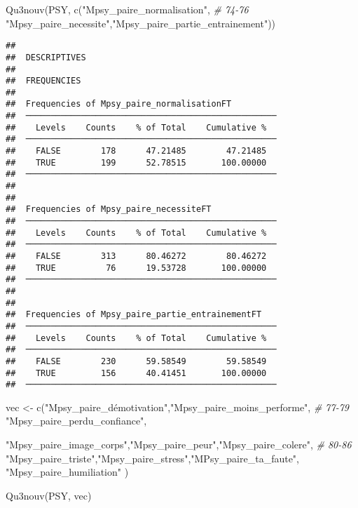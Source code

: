 \documentclass[
]{article}
\newenvironment{Shaded}{\begin{snugshade}}{\end{snugshade}}
\newcommand{\CommentTok}[1]{\textcolor[rgb]{0.56,0.35,0.01}{\textit{#1}}}
\newcommand{\FunctionTok}[1]{\textcolor[rgb]{0.00,0.00,0.00}{#1}}
\newcommand{\NormalTok}[1]{#1}
\newcommand{\OtherTok}[1]{\textcolor[rgb]{0.56,0.35,0.01}{#1}}
\newcommand{\StringTok}[1]{\textcolor[rgb]{0.31,0.60,0.02}{#1}}
\begin{document}
\begin{Shaded}
\begin{Highlighting}[]
\FunctionTok{Qu3nouv}\NormalTok{(PSY, }\FunctionTok{c}\NormalTok{(}\StringTok{"Mpsy\_paire\_normalisation"}\NormalTok{,  }\CommentTok{\# 74{-}76}
               \StringTok{"Mpsy\_paire\_necessite"}\NormalTok{,}\StringTok{"Mpsy\_paire\_partie\_entrainement"}\NormalTok{))}
\end{Highlighting}
\end{Shaded}

\begin{verbatim}
## 
##  DESCRIPTIVES
## 
##  FREQUENCIES
## 
##  Frequencies of Mpsy_paire_normalisationFT          
##  ────────────────────────────────────────────────── 
##    Levels    Counts    % of Total    Cumulative %   
##  ────────────────────────────────────────────────── 
##    FALSE        178      47.21485        47.21485   
##    TRUE         199      52.78515       100.00000   
##  ────────────────────────────────────────────────── 
## 
## 
##  Frequencies of Mpsy_paire_necessiteFT              
##  ────────────────────────────────────────────────── 
##    Levels    Counts    % of Total    Cumulative %   
##  ────────────────────────────────────────────────── 
##    FALSE        313      80.46272        80.46272   
##    TRUE          76      19.53728       100.00000   
##  ────────────────────────────────────────────────── 
## 
## 
##  Frequencies of Mpsy_paire_partie_entrainementFT    
##  ────────────────────────────────────────────────── 
##    Levels    Counts    % of Total    Cumulative %   
##  ────────────────────────────────────────────────── 
##    FALSE        230      59.58549        59.58549   
##    TRUE         156      40.41451       100.00000   
##  ──────────────────────────────────────────────────
\end{verbatim}

\begin{Shaded}
\begin{Highlighting}[]
\NormalTok{vec }\OtherTok{\textless{}{-}} \FunctionTok{c}\NormalTok{(}\StringTok{"Mpsy\_paire\_démotivation"}\NormalTok{,}\StringTok{"Mpsy\_paire\_moins\_performe"}\NormalTok{,  }\CommentTok{\# 77{-}79}
         \StringTok{"Mpsy\_paire\_perdu\_confiance"}\NormalTok{,  }
         
    \StringTok{"Mpsy\_paire\_image\_corps"}\NormalTok{,}\StringTok{"Mpsy\_paire\_peur"}\NormalTok{,}\StringTok{"Mpsy\_paire\_colere"}\NormalTok{,  }\CommentTok{\# 80{-}86}
    \StringTok{"Mpsy\_paire\_triste"}\NormalTok{,}\StringTok{"Mpsy\_paire\_stress"}\NormalTok{,}\StringTok{"MPsy\_paire\_ta\_faute"}\NormalTok{,}
    \StringTok{"Mpsy\_paire\_humiliation"}\NormalTok{ )}

\FunctionTok{Qu3nouv}\NormalTok{(PSY, vec)}
\end{Highlighting}
\end{Shaded}
\end{document}
